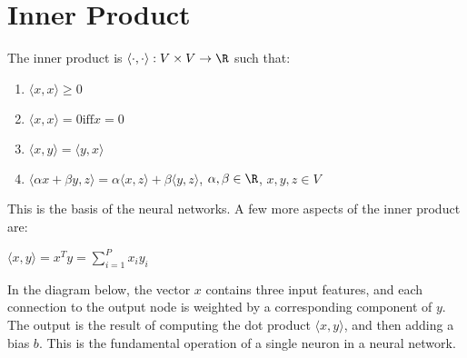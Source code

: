 \section{Inner Product}

The inner product is $\langle\cdot,\cdot\rangle: V \times V \rightarrow\R$ such that:

\begin{enumerate}
	\item $\langle x,x \rangle \geq 0$
	\item $\langle x,x \rangle = 0 \text{iff} x=0$
	\item $\langle x,y \rangle = \langle y,x \rangle$
	\item $\langle \alpha x+ \beta y,z \rangle = \alpha \langle x,z \rangle + \beta \langle y,z 			\rangle$,				$\alpha,\beta \in \R$,
			$x,y,z \in V$
\end{enumerate}

This is the basis of the neural networks. A few more aspects of the inner product are:

\vspace{0.8em} 

$\langle x,y \rangle = x^T y = \sum_{i=1}^{P}x_i y_i$

\vspace{1em} 

In the diagram below, the vector $x$ contains three input features, and each connection
to the output node is weighted by a corresponding component of $y$. The output is the
result of computing the dot product $\langle x, y \rangle$, and then adding a bias $b$. 
This is the fundamental operation of a single neuron in a neural network.


